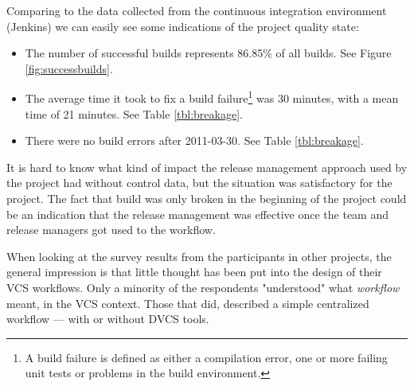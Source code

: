 \documentclass{llncs}
\begin{document}
Comparing to the data collected from the continuous integration
environment (Jenkins) we can easily see some indications of the
project quality state:

\begin{itemize}
 \item The number of successful builds represents 86.85\% of all
       builds. See Figure \ref{fig:successbuilds}. 
 \item The average time it took to fix a build failure\footnote{
        A build failure is defined as either a compilation error, 
        one or more failing unit tests or problems in the build 
        environment.
       } was 30 minutes, with a mean time of 21 minutes. See Table
       \ref{tbl:breakage}.
 \item There were no build errors after 2011-03-30. See Table
       \ref{tbl:breakage}.
\end{itemize}

It is hard to know what kind of impact the release management approach
used by the project had without control data, but the situation was
satisfactory for the project. The fact that build was only broken in
the beginning of the project could be an indication that the release
management was effective once the team and release managers got used
to the workflow.

When looking at the survey results from the participants in other
projects, the general impression is that little thought has been put
into the design of their VCS workflows. Only a minority of the
respondents "understood" what \emph{workflow} meant, in the VCS
context. Those that did, described a simple centralized workflow ---
with or without DVCS tools.
\end{document}
